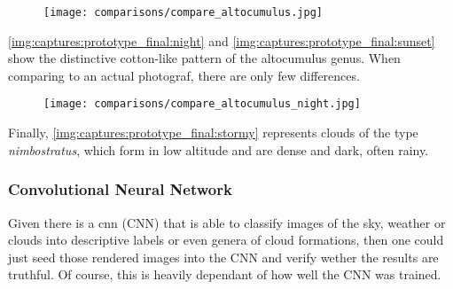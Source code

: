\begin{figure}[H]
    \centering
    \texttt{[image: comparisons/compare\_altocumulus.jpg]}
    \label{img:comparisons:altocumulus}
\end{figure}

\noindent
\autoref{img:captures:prototype_final:night} and \autoref{img:captures:prototype_final:sunset} show the distinctive cotton-like pattern of the altocumulus genus.
When comparing to an actual photograf, there are only few differences.

\begin{figure}[H]
    \centering
    \texttt{[image: comparisons/compare\_altocumulus\_night.jpg]}
    \label{img:comparisons:altocumulus:night}
\end{figure}


\noindent
Finally, \autoref{img:captures:prototype_final:stormy} represents clouds of the type \textit{nimbostratus}, which form in low altitude and are dense and dark, often rainy.

\subsubsection{Convolutional Neural Network}
Given there is a \gls{cnn} (CNN) that is able to classify images of the sky, weather or clouds into descriptive labels or even genera of cloud formations, then one could just seed those rendered images into the CNN and verify wether the results are truthful.
Of course, this is heavily dependant of how well the CNN was trained. 